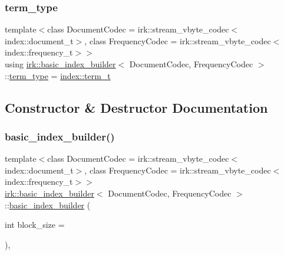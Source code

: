 \mbox{\label{classirk_1_1basic__index__builder_a612e4d83700711a72d442056226a2908}} 
\subsubsection{\texorpdfstring{term\+\_\+type}{term\_type}}
{\footnotesize\ttfamily template$<$class Document\+Codec  = irk\+::stream\+\_\+vbyte\+\_\+codec$<$index\+::document\+\_\+t$>$, class Frequency\+Codec  = irk\+::stream\+\_\+vbyte\+\_\+codec$<$index\+::frequency\+\_\+t$>$$>$ \\
using \mbox{\hyperlink{classirk_1_1basic__index__builder}{irk\+::basic\+\_\+index\+\_\+builder}}$<$ Document\+Codec, Frequency\+Codec $>$\+::\mbox{\hyperlink{classirk_1_1basic__index__builder_a612e4d83700711a72d442056226a2908}{term\+\_\+type}} =  \mbox{\hyperlink{namespaceirk_1_1index_a7c2517c1f98e5b5f30ba3ab2f837caf6}{index\+::term\+\_\+t}}}



\subsection{Constructor \& Destructor Documentation}
\mbox{\label{classirk_1_1basic__index__builder_a82fdaa57c7b4db8620fc4633d8359f77}} 
\subsubsection{\texorpdfstring{basic\+\_\+index\+\_\+builder()}{basic\_index\_builder()}}
{\footnotesize\ttfamily template$<$class Document\+Codec  = irk\+::stream\+\_\+vbyte\+\_\+codec$<$index\+::document\+\_\+t$>$, class Frequency\+Codec  = irk\+::stream\+\_\+vbyte\+\_\+codec$<$index\+::frequency\+\_\+t$>$$>$ \\
\mbox{\hyperlink{classirk_1_1basic__index__builder}{irk\+::basic\+\_\+index\+\_\+builder}}$<$ Document\+Codec, Frequency\+Codec $>$\+::\mbox{\hyperlink{classirk_1_1basic__index__builder}{basic\+\_\+index\+\_\+builder}} (\begin{DoxyParamCaption}\item[{int}]{block\+\_\+size = {} }\end{DoxyParamCaption})\hspace{0.3cm}{\ttfamily [inline]}, {\ttfamily [explicit]}}



